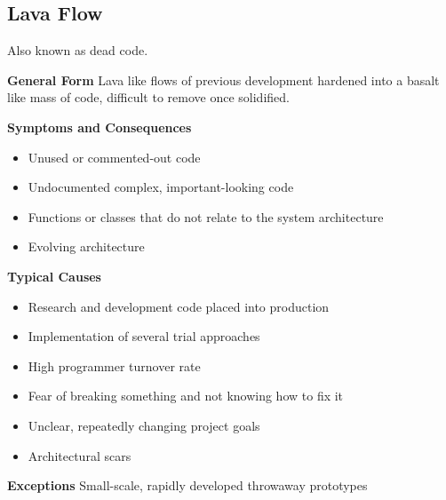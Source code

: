 \subsection{Lava Flow}
Also known as dead code.
\begin{description}
  \item \textbf{General Form} Lava like flows of previous development hardened into a basalt like mass of code, difficult to remove once solidified.
  \item \textbf{Symptoms and Consequences}
  \begin{itemize}
    \item Unused or commented-out code
    \item Undocumented complex, important-looking code
    \item Functions or classes that do not relate to the system architecture
    \item Evolving architecture
  \end{itemize}
  \item \textbf{Typical Causes}
  \begin{itemize}
    \item Research and development code placed into production
    \item Implementation of several trial approaches
    \item High programmer turnover rate
    \item Fear of breaking something and not knowing how to fix it
    \item Unclear, repeatedly changing project goals
    \item Architectural scars
  \end{itemize}
  \item \textbf{Exceptions} Small-scale, rapidly developed throwaway prototypes
\end{description}
\newpage

